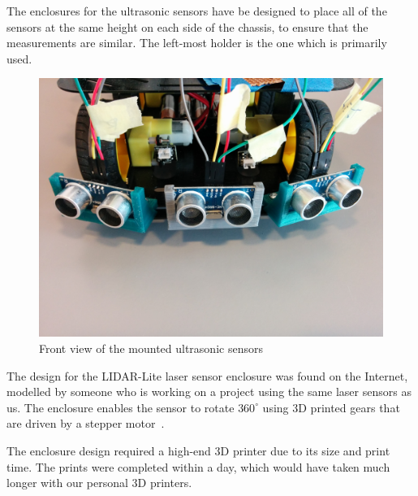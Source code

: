 The enclosures for the ultrasonic sensors have be designed to place all of the sensors at the same height on each side of the chassis, to ensure that the measurements are similar. The left-most holder is the one which is primarily used.

\begin{figure}[H]
	\centering
	\includegraphics[width=.6\linewidth]{images/mounted_ultrasonic_sensors.jpg}
	\caption{Front view of the mounted ultrasonic sensors}
	\label{fig:ultrasonic-mounted}
\end{figure}

The design for the LIDAR-Lite laser sensor enclosure was found on the Internet, modelled by someone who is working on a project using the same laser sensors as us. The enclosure enables the sensor to rotate $360^\circ$ using 3D printed gears that are driven by a stepper motor~\cite{lidarenclosure}.

The enclosure design required a high-end 3D printer due to its size and print time. The prints were completed within a day, which would have taken much longer with our personal 3D printers.

